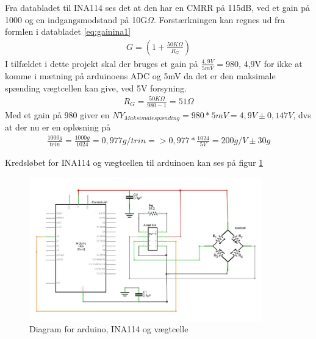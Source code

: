 Fra databladet til INA114 ses det at den har en CMRR på 115dB, ved et gain på 1000 og en indgangsmodstand på 10G$\Omega$. Forstærkningen kan regnes ud fra formlen i databladet \ref{eq:gainina1}
\begin{align}
 G=(1+\frac{50K\Omega}{R_{G}})
 \label{eq:gainina1}
 \end{align} 
 I tilfældet i dette projekt skal der bruges et gain på $\frac{4,9V}{5mV}=980$, 4,9V for ikke at komme i mætning på arduinoens ADC og 5mV da det er den maksimale spænding vægtcellen kan give, ved 5V forsyning.
 \begin{align}
 R_{G}=\frac{50K\Omega}{980-1}=51\Omega
 \label{eq:gainina2}
 \end{align}
Med et gain på 980 giver en $NY_{Maksimalespænding}=980*5mV=4,9V \pm0,147V$, dvs at der nu er en opløsning på
\begin{align}
 \frac{1000g}{trin}=\frac{1000g}{1024}=0,977g/trin=>0,977*\frac{1024}{5V}=200g/V \pm30g
 \label{eq:gainina3}
 \end{align}
 
 Kredsløbet for INA114 og vægtcellen til arduinoen kan ses på figur \ref{fig:loadcelldiagram}
 
  \begin{figure}[H]
	\centering
	\includegraphics[width=0.9\textwidth]{billeder/Hardware/diagrammer/loadcelldiagram.JPG}
	\caption{Diagram for arduino, INA114 og vægtcelle}
	\label{fig:loadcelldiagram}
\end{figure}

